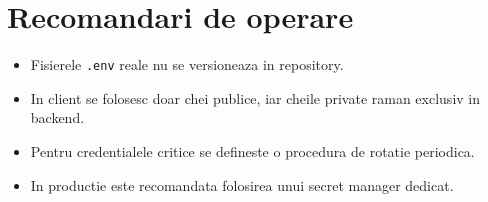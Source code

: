 \section{Recomandari de operare}

\begin{itemize}[leftmargin=1.2cm]
    \item Fisierele \texttt{.env} reale nu se versioneaza in repository.
    \item In client se folosesc doar chei publice, iar cheile private raman exclusiv in backend.
    \item Pentru credentialele critice se defineste o procedura de rotatie periodica.
    \item In productie este recomandata folosirea unui secret manager dedicat.
\end{itemize}
